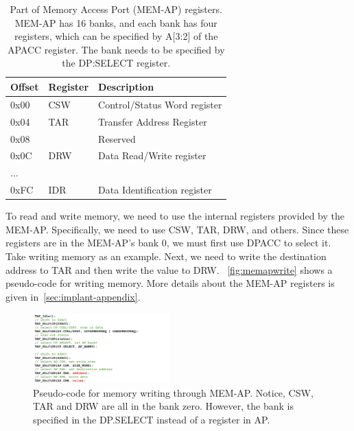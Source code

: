 \begin{center}
	\begin{table}
		\small
		\begin{tabular}{l l l} 
			\hline
			Offset & Register &  Description  \\ 
			\hline
			0x00 & CSW & Control/Status Word register \\
			\hline
			0x04 & TAR & Transfer Address Register \\
			\hline
			0x08 & & Reserved \\
			\hline
			0x0C & DRW & Data Read/Write register\\
			\hline
			... & & \\
			\hline
			0xFC & IDR & Data Identification register\\
			\hline
		\end{tabular}
		\caption{Part of Memory Access Port (MEM-AP) registers. MEM-AP has 16 banks, and each bank has four registers, which can be specified by A[3:2] of the APACC register. The bank needs to be specified by the DP:SELECT register.}
		\label{tab:memapreg}
	\end{table}
\end{center}





To read and write memory, we need to use the internal registers provided by the MEM-AP. Specifically, we need to use CSW, TAR, DRW, and others. Since these registers are in the MEM-AP's bank 0, we must first use DPACC to select it. Take writing memory as an example. Next, we need to write the destination address to TAR and then write the value to DRW. ~\autoref{fig:memapwrite} shows a pseudo-code for writing memory. More details about the MEM-AP registers is given in~\autoref{sec:implant-appendix}. 


\begin{figure}[ht]
	\includegraphics[width=0.47\textwidth]{figures/memapwrite2}
	\centering
	\caption{Pseudo-code for memory writing through MEM-AP. Notice, CSW, TAR and DRW are all in the bank zero. However, the bank is specified in the DP.SELECT instead of a register in AP.}
	\label{fig:memapwrite}
\end{figure}



